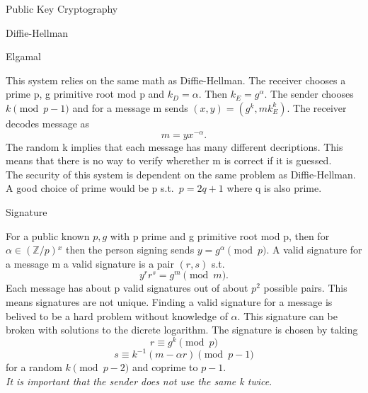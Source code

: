 \documentclass[12pt, letterpaper]{article}
\begin{document}
\begin{section}{Public Key Cryptography}
\begin{subsection}{Diffie-Hellman}
  \end{subsection}

  \begin{subsection}{Elgamal}

    This system relies on the same math as Diffie-Hellman. The receiver chooses
    a prime p, g primitive root mod p and \(k_{D} = \alpha\). Then \(k_{E} =
    g^{\alpha}\). The sender chooses \(k \pmod{p - 1}\) and for a message m
    sends \((x, y) = (g^{k}, mk_{E}^{k})\). The receiver decodes message as
    \[m = yx^{-\alpha}.\] The random k implies that each message has many
    different decriptions. This means that there is no way to verify wherether
    m is correct if it is guessed. \\
    The security of this system is dependent on the same problem as
    Diffie-Hellman. \\
    A good choice of prime would be p s.t.\ \(p = 2q + 1\) where q is also
    prime.

    \begin{subsubsection}{Signature}

      For a public known \(p, g\) with p prime and g primitive root mod p, then
      for \(\alpha \in (\mathbb{Z} / p){}^{x}\) then the person signing sends
      \(y = g^{\alpha} \pmod{p}\). A valid signature for a message m a valid
      signature is a pair \((r, s)\) s.t.\ \[y^{r}r^{s} = g^{m} \pmod{m}.\]
      Each message has about p valid signatures out of about \(p^{2}\) possible
      pairs. This means signatures are not unique. Finding a valid signature
      for a message is belived to be a hard problem without knowledge of
      \(\alpha\). This signature can be broken with solutions to the dicrete
      logarithm. The signature is chosen by taking \[r \equiv g^{k} \pmod{p}\]
      \[s \equiv k^{-1}(m - \alpha r) \pmod{p - 1}\] for a random
      \(k \pmod{p - 2}\) and coprime to \(p - 1\). \\
      \textit{It is important that the sender does not use the same k twice}.

    \end{subsubsection}

  \end{subsection}

\end{section}
\end{document}
